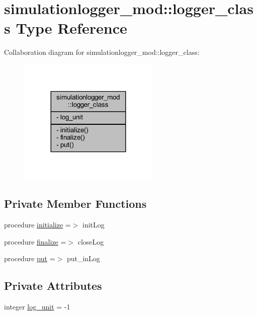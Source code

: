 \hypertarget{structsimulationlogger__mod_1_1logger__class}{}\section{simulationlogger\+\_\+mod\+:\+:logger\+\_\+class Type Reference}
\label{structsimulationlogger__mod_1_1logger__class}


Collaboration diagram for simulationlogger\+\_\+mod\+:\+:logger\+\_\+class\+:\nopagebreak
\begin{figure}[H]
\begin{center}
\leavevmode
\includegraphics[width=191pt]{structsimulationlogger__mod_1_1logger__class__coll__graph}
\end{center}
\end{figure}
\subsection*{Private Member Functions}
\begin{DoxyCompactItemize}
\item 
procedure \mbox{\hyperlink{structsimulationlogger__mod_1_1logger__class_ab17db063f6675a56da96ace4f6b0d422}{initialize}} =$>$ init\+Log
\item 
procedure \mbox{\hyperlink{structsimulationlogger__mod_1_1logger__class_aecc1684a185a86d8bf4599c265894b38}{finalize}} =$>$ close\+Log
\item 
procedure \mbox{\hyperlink{structsimulationlogger__mod_1_1logger__class_abe32488ffbf501397d43d1a61826cda6}{put}} =$>$ put\+\_\+in\+Log
\end{DoxyCompactItemize}
\subsection*{Private Attributes}
\begin{DoxyCompactItemize}
\item 
integer \mbox{\hyperlink{structsimulationlogger__mod_1_1logger__class_a3eb0b4ee7724fc420af081967ce767bd}{log\+\_\+unit}} = -\/1
\end{DoxyCompactItemize}


